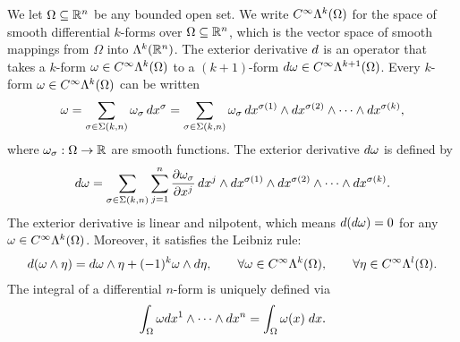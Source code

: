 \documentclass[10pt,a4paper]{article}
\begin{document}
We let $\Omega \subseteq {\mathbb R}^{n}$ be any bounded open set.
We write $C^{\infty}\Lambda^{k}(\Omega)$ for the space of smooth differential $k$-forms over $\Omega \subseteq {\mathbb R}^{n}$,
which is the vector space of smooth mappings from $\Omega$ into $\Lambda^{k}({\mathbb R}^{n})$.
The exterior derivative \( d \) is an operator that takes a \( k \)-form \( \omega \in C^{\infty}\Lambda^{k}(\Omega) \) 
to a \((k+1)\)-form \( d\omega \in C^{\infty}\Lambda^{k+1}(\Omega) \). 
Every \( k \)-form \( \omega \in C^{\infty}\Lambda^{k}(\Omega) \) can be written 
\begin{gather*}
    \omega 
    = 
    \sum_{ \sigma \in \Sigma(k,n) } 
    \omega_{\sigma} \, 
    dx^{\sigma}
    = 
    \sum_{ \sigma \in \Sigma(k,n) } 
    \omega_{\sigma} \, 
    dx^{\sigma(1)} \wedge dx^{\sigma(2)} \wedge \cdots \wedge dx^{\sigma(k)},
\end{gather*}
where \( \omega_{\sigma} : \Omega \rightarrow {\mathbb R} \) are smooth functions.
The exterior derivative \( d\omega \) is defined by
\begin{gather*}
    d\omega = 
    \sum_{ \sigma \in \Sigma(k,n) } 
    \sum_{j=1}^{n} 
    \frac{\partial \omega_{\sigma}}{\partial x^j} 
    \, dx^j \wedge 
    dx^{\sigma(1)} \wedge dx^{\sigma(2)} \wedge \cdots \wedge dx^{\sigma(k)}.
\end{gather*}
The exterior derivative is linear and nilpotent, which means 
\( d(d\omega) = 0 \) for any \( \omega \in C^{\infty}\Lambda^{k}(\Omega) \).
Moreover, it satisfies the Leibniz rule:
\begin{gather*} 
    d(\omega \wedge \eta) 
    = 
    d\omega \wedge \eta + (-1)^{k} \omega \wedge d\eta, 
    \qquad \forall \omega \in C^{\infty}\Lambda^{k}(\Omega), 
    \qquad \forall \eta \in C^{\infty}\Lambda^{l}(\Omega).
\end{gather*}
The integral of a differential $n$-form is uniquely defined via 
\begin{gather*}
    \int_{\Omega} \omega dx^{1} \wedge \dots \wedge dx^{n} = \int_{\Omega} \omega(x) \;dx
    . 
\end{gather*}
\end{document}
